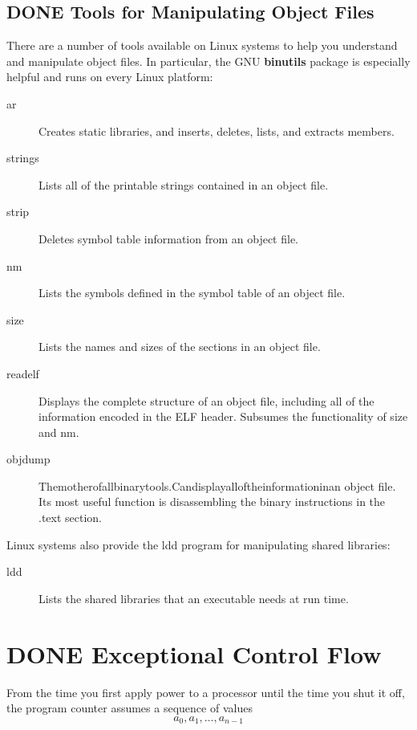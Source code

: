 \documentclass[11pt]{article}
\begin{document}
\subsection{{\bfseries\sffamily DONE} Tools for Manipulating Object Files}
\label{sec:org0c048c4}
There are a number of tools available on Linux systems to help you understand and manipulate object files. In particular, the GNU \textbf{binutils} package is especially helpful and runs on every Linux platform:\\
\begin{description}
\item[{ar}] Creates static libraries, and inserts, deletes, lists, and extracts members.\\
\item[{strings}] Lists all of the printable strings contained in an object file.\\
\item[{strip}] Deletes symbol table information from an object file.\\
\item[{nm}] Lists the symbols defined in the symbol table of an object file.\\
\item[{size}] Lists the names and sizes of the sections in an object file.\\
\item[{readelf}] Displays the complete structure of an object file, including all of the information encoded in the ELF header. Subsumes the functionality of size and nm.\\
\item[{objdump}] Themotherofallbinarytools.Candisplayalloftheinformationinan object file. Its most useful function is disassembling the binary instructions in the .text section.\\
\end{description}

Linux systems also provide the ldd program for manipulating shared libraries:\\
\begin{description}
\item[{ldd}] Lists the shared libraries that an executable needs at run time.\\
\end{description}


\section{{\bfseries\sffamily DONE} Exceptional Control Flow}
\label{sec:org2346d0e}
From the time you first apply power to a processor until the time you shut it off, the program counter assumes a sequence of values\\
\begin{equation}
a_0, a_1, \dots , a_{n−1}
\end{equation}
\end{document}
